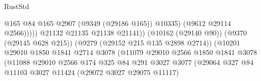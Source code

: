 \begin{lexlean}{RustStd}
\begin{coremodule}
{\begin{coremodule}
{{{{{{{{{{{{{{{{{{{{{{{{{{{{{{{{{{{{{{{                                                              @165
                                                              @84
                                                              @165
                                                              @2907
                                                              (@9349 (@29186 @165))
                                                              @10335)
                                                            (@9612 @29114 @2566)))))
                                                    @21132
                                                    @21135
                                                    @21138
                                                    @21141))
                                                (@10162 (@29140 @90))
                                                (@9370 (@29145 @628 @215))
                                                (@9279 (@29152 @215 @135 @2898 @2714))
                                                (@10201
                                                  @29010
                                                  @1850
                                                  @1841
                                                  @2714
                                                  @3078
                                                  (@11079
                                                    @29010
                                                    @2566
                                                    @1850
                                                    @1841
                                                    @3078
                                                    (@11088
                                                      @29010
                                                      @2566
                                                      @174
                                                      @325
                                                      @84
                                                      @291
                                                      @3027
                                                      @3077
                                                      (@29064
                                                        @327
                                                        @84
                                                        @11103
                                                        @3027
                                                        @11424
                                                        (@29072 @3027 @29075 @11117)
}}}}}}}}}}}}}}}}}}}}}}}}}}}}}}}}}}}}}}}
\end{coremodule}}
\end{coremodule}
\end{lexlean}
